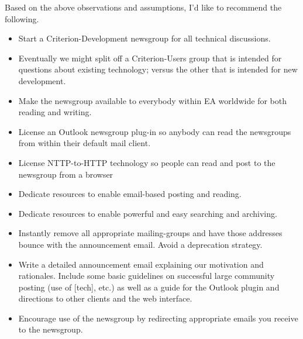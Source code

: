 \documentclass[twocolumn]{paper}
\begin{document}
Based on the above observations and assumptions, I'd like to
recommend the following.
\begin{itemize}
    \item Start a Criterion-Development newsgroup for all technical
    discussions.
    \item Eventually we might split off a Criterion-Users group that is
    intended for questions about existing technology; versus the other
    that is intended for new development.
    \item Make the newsgroup available to everybody
    within EA worldwide for both reading and writing.
    \item License an Outlook newsgroup plug-in so anybody can read
    the newsgroups from within their default mail client.
    \item License NTTP-to-HTTP technology so people can read and
    post to the newsgroup from a browser
    \item Dedicate resources to enable email-based posting and
    reading.
    \item Dedicate resources to enable powerful and easy searching
    and archiving.
    \item Instantly remove all appropriate mailing-groups and have those addresses bounce with the announcement email. Avoid a
    deprecation strategy.
    \item Write a detailed announcement email explaining our
    motivation and rationales. Include some basic guidelines on
    successful large community posting (use of [tech], etc.) as well
    as a guide for the Outlook plugin and directions to other
    clients and the web interface.
    \item Encourage use of the newsgroup by redirecting appropriate emails you
    receive to the newsgroup.
\end{itemize}
\end{document}
